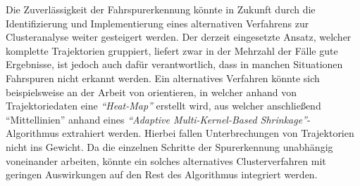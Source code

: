 Die Zuverlässigkeit der Fahrspurerkennung könnte in Zukunft durch die Identifizierung und Implementierung
eines alternativen Verfahrens zur Clusteranalyse weiter gesteigert werden.
Der derzeit eingesetzte Ansatz, welcher komplette Trajektorien gruppiert, liefert zwar in der Mehrzahl der Fälle
gute Ergebnisse, ist jedoch auch dafür verantwortlich, dass in manchen Situationen Fahrspuren nicht erkannt werden.
Ein alternatives Verfahren könnte sich beispielsweise an der Arbeit von \cite[]{Xu2015} orientieren, in welcher
anhand von Trajektoriedaten eine \textit{``Heat-Map''} erstellt wird, aus welcher anschließend ``Mittellinien''
anhand eines \textit{``Adaptive Multi-Kernel-Based Shrinkage''}-Algorithmus extrahiert werden.
Hierbei fallen Unterbrechungen von Trajektorien nicht ins Gewicht.
Da die einzelnen Schritte der Spurerkennung unabhängig voneinander arbeiten, könnte ein
solches alternatives Clusterverfahren mit geringen Auswirkungen auf den Rest des Algorithmus integriert werden.